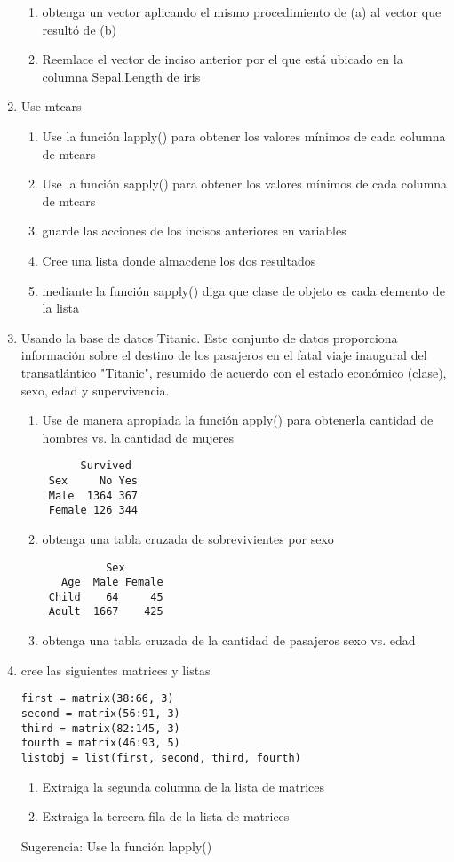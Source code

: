 \documentclass[12pt]{article} %
\begin{document}
\begin{enumerate}
\begin{enumerate}
\item obtenga un vector aplicando el mismo procedimiento de (a) al vector que resultó de (b)
\item Reemlace el vector de inciso anterior por el que está ubicado en la columna Sepal.Length de iris
\end{enumerate}
\item Use mtcars
\begin{enumerate}
\item Use la función lapply() para obtener los valores mínimos de cada columna de mtcars
\item Use la función sapply() para obtener los valores mínimos de cada columna de mtcars
\item guarde las acciones de los incisos anteriores en variables
\item Cree una lista donde almacdene los dos resultados
\item mediante la función sapply() diga que clase de objeto es cada elemento de la lista
\end{enumerate}
\item Usando la base de datos Titanic. Este conjunto de datos proporciona información sobre el destino de los pasajeros en el fatal viaje inaugural del transatlántico "Titanic", resumido de acuerdo con el estado económico (clase), sexo, edad y supervivencia.
\begin{enumerate}
\item Use de manera apropiada la función apply() para obtenerla cantidad de hombres vs. la cantidad de mujeres
\begin{verbatim}
      Survived
 Sex     No Yes
 Male  1364 367
 Female 126 344
\end{verbatim}
\item obtenga una tabla cruzada de sobrevivientes por sexo
\begin{verbatim}
          Sex
   Age  Male Female
 Child    64     45
 Adult  1667    425
\end{verbatim}
\item obtenga una tabla cruzada de la cantidad de pasajeros sexo vs. edad
\end{enumerate}
\item cree las siguientes matrices y listas
\begin{verbatim}
first = matrix(38:66, 3)
second = matrix(56:91, 3)
third = matrix(82:145, 3)
fourth = matrix(46:93, 5)
listobj = list(first, second, third, fourth)
\end{verbatim}
\begin{enumerate}
\item Extraiga la segunda columna de la lista de matrices
\item Extraiga la tercera fila de la lista de matrices
\end{enumerate}
Sugerencia: Use la función lapply()
\end{enumerate}
\end{document}
